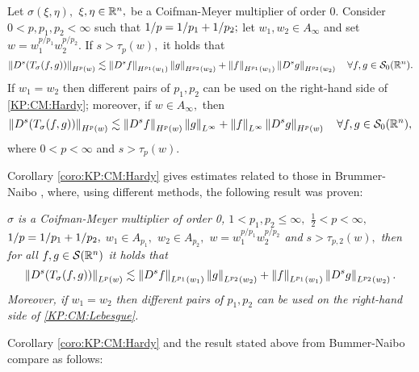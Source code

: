 \begin{corollary}\label{coro:KP:CM:Hardy}  Let $\sigma(\xi,\eta),$ $\xi,\eta\in{{\mathbb R}^n},$ be a Coifman-Meyer multiplier of order $0.$ 
Consider  $0 < p, p_1, p_2  < \infty$  such that $1/p=1/p_1+1/p_2;$ let  $w_1,w_2\in A_\infty$ and set $w=w_1^{{p}/{p_1}} w_2^{{p}/{p_2}}.$ 
If  $s > \tau_p(w),$ it holds that
\begin{equation}\label{KP:CM:Hardy}
\left\|D^s(T_\sigma(f,g))\right\|_{H^p(w)} \lesssim \left\|D^s f\right\|_{H^{p_1}(w_1)} \left\|g\right\|_{H^{p_2}(w_2)} +  \left\|f\right\|_{H^{p_1}(w_1)}   \left\|D^s g\right\|_{H^{p_2}(w_2)} \quad \forall f, g \in {\mathcal{S}_0}({{\mathbb R}^n}).
\end{equation}
If $w_1=w_2$ then different pairs of $p_1, p_2$ can be used on the right-hand side of \eqref{KP:CM:Hardy}; moreover, if $w\in A_\infty,$ then 
\begin{equation}\label{Kp:CM:Hardy2}
\left\|D^s(T_\sigma(f,g))\right\|_{H^p(w)} \lesssim \left\|D^s f\right\|_{H^{p}(w)} \left\|g\right\|_{L^\infty} +  \left\|f\right\|_{L^\infty}   \left\|D^s g\right\|_{H^{p}(w)} \quad \forall f, g \in {\mathcal{S}_0}({{\mathbb R}^n}),
\end{equation}
where $0<p<\infty$ and $s>\tau_{p}(w).$

\end{corollary}

Corollary \ref{coro:KP:CM:Hardy} gives estimates related to those in Brummer-Naibo \cite{BrNa2017}, where, using different methods, the following result was proven:

\textit{$\sigma$ is a Coifman-Meyer multiplier of order 0, $1<p_1,p_2\le \infty,$ $\frac{1}{2}<p<\infty,$ $1/p=1/p_1+1/p_2,$  $w_1\in A_{p_1},$ $w_2\in A_{p_2},$ $w=w_1^{{p}/{p_1}} w_2^{{p}/{p_2}}$ and $s>\tau_{p,2}(w),$ then for all $f,g\in {\mathcal{S}}({{\mathbb R}^n})$ it holds that
\begin{equation}\label{KP:CM:Lebesgue}
\left\|D^s(T_\sigma(f,g))\right\|_{L^p(w)} \lesssim \left\|D^s f\right\|_{L^{p_1}(w_1)} \left\|g\right\|_{L^{p_2}(w_2)} +  \left\|f\right\|_{L^{p_1}(w_1)}   \left\|D^s g\right\|_{L^{p_2}(w_2)}. 
\end{equation}
Moreover, if $w_1=w_2$ then different pairs of $p_1, p_2$ can be used on the right-hand side of \eqref{KP:CM:Lebesgue}.
}

Corollary \ref{coro:KP:CM:Hardy} and the result stated above from Bummer-Naibo compare as follows: 

